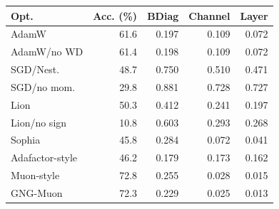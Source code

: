 \begin{tabular}{lrrrr}
\toprule
Opt. & Acc. (\%) & BDiag & Channel & Layer \\
\midrule
AdamW & 61.6 & 0.197 & 0.109 & 0.072 \\
AdamW/no WD & 61.4 & 0.198 & 0.109 & 0.072 \\
SGD/Nest. & 48.7 & 0.750 & 0.510 & 0.471 \\
SGD/no mom. & 29.8 & 0.881 & 0.728 & 0.727 \\
Lion & 50.3 & 0.412 & 0.241 & 0.197 \\
Lion/no sign & 10.8 & 0.603 & 0.293 & 0.268 \\
Sophia & 45.8 & 0.284 & 0.072 & 0.041 \\
Adafactor-style & 46.2 & 0.179 & 0.173 & 0.162 \\
Muon-style & 72.8 & 0.255 & 0.028 & 0.015 \\
GNG-Muon & 72.3 & 0.229 & 0.025 & 0.013 \\
\bottomrule
\end{tabular}
